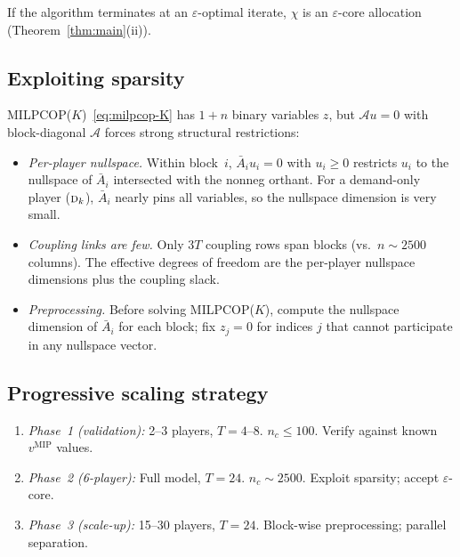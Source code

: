 \documentclass[11pt]{article}
\theoremstyle{definition}
\newcommand{\vmip}{v^{\mathrm{MIP}}}
\begin{document}
If the algorithm terminates at an $\varepsilon$-optimal iterate,
$\chi$ is an $\varepsilon$-core allocation
(Theorem~\ref{thm:main}(ii)).

\subsection{Exploiting sparsity}
\label{sec:sparsity}

MILPCOP($K$)~\eqref{eq:milpcop-K} has $1+n$ binary variables $z$, but
$\mathcal{A}u=0$ with block-diagonal $\mathcal{A}$ forces strong
structural restrictions:

\begin{itemize}[leftmargin=1.2em]
\item \emph{Per-player nullspace.}  Within block~$i$,
  $\bar A_iu_i=0$ with $u_i\ge0$ restricts $u_i$ to the nullspace of
  $\bar A_i$ intersected with the nonneg orthant.  For a demand-only
  player ($\textsc{d}_k$), $\bar A_i$ nearly pins all variables, so
  the nullspace dimension is very small.
\item \emph{Coupling links are few.}  Only $3T$ coupling rows span
  blocks (vs.\ $n\sim2500$ columns).  The effective degrees of freedom
  are the per-player nullspace dimensions plus the coupling slack.
\item \emph{Preprocessing.}  Before solving MILPCOP($K$), compute the
  nullspace dimension of $\bar A_i$ for each block; fix $z_j=0$ for
  indices $j$ that cannot participate in any nullspace vector.
\end{itemize}

\subsection{Progressive scaling strategy}
\label{sec:scaling}

\begin{enumerate}[leftmargin=1.6em]
\item \emph{Phase~1 (validation):} 2--3 players, $T=4$--$8$.
  $n_c\le100$.  Verify against known $\vmip$ values.
\item \emph{Phase~2 (6-player):} Full model, $T=24$.
  $n_c\sim2500$.  Exploit sparsity; accept $\varepsilon$-core.
\item \emph{Phase~3 (scale-up):} 15--30 players, $T=24$.
  Block-wise preprocessing; parallel separation.
\end{enumerate}
\end{document}
